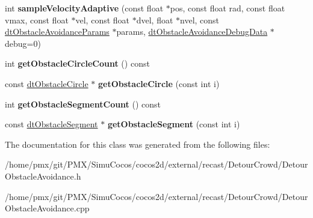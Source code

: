 \begin{DoxyCompactItemize}
\item 
\mbox{\label{classdtObstacleAvoidanceQuery_aecf2d1d53bc0c74997ff3aac1587c242}} 
int {\bfseries sample\+Velocity\+Adaptive} (const float $\ast$pos, const float rad, const float vmax, const float $\ast$vel, const float $\ast$dvel, float $\ast$nvel, const \hyperlink{structdtObstacleAvoidanceParams}{dt\+Obstacle\+Avoidance\+Params} $\ast$params, \hyperlink{classdtObstacleAvoidanceDebugData}{dt\+Obstacle\+Avoidance\+Debug\+Data} $\ast$debug=0)
\item 
\mbox{\label{classdtObstacleAvoidanceQuery_ae520788c1150ae9c0efa15ddee6b44a6}} 
int {\bfseries get\+Obstacle\+Circle\+Count} () const
\item 
\mbox{\label{classdtObstacleAvoidanceQuery_a2de5b7639831faa59a708b2ed3cd6f15}} 
const \hyperlink{structdtObstacleCircle}{dt\+Obstacle\+Circle} $\ast$ {\bfseries get\+Obstacle\+Circle} (const int i)
\item 
\mbox{\label{classdtObstacleAvoidanceQuery_a38c5fdba38e19e6c7481b75d089e45b6}} 
int {\bfseries get\+Obstacle\+Segment\+Count} () const
\item 
\mbox{\label{classdtObstacleAvoidanceQuery_a60779b0d519def7ae2101ad153266cd2}} 
const \hyperlink{structdtObstacleSegment}{dt\+Obstacle\+Segment} $\ast$ {\bfseries get\+Obstacle\+Segment} (const int i)
\end{DoxyCompactItemize}


The documentation for this class was generated from the following files\+:\begin{DoxyCompactItemize}
\item 
/home/pmx/git/\+P\+M\+X/\+Simu\+Cocos/cocos2d/external/recast/\+Detour\+Crowd/Detour\+Obstacle\+Avoidance.\+h\item 
/home/pmx/git/\+P\+M\+X/\+Simu\+Cocos/cocos2d/external/recast/\+Detour\+Crowd/Detour\+Obstacle\+Avoidance.\+cpp\end{DoxyCompactItemize}
